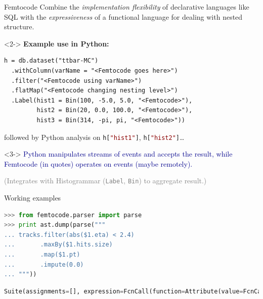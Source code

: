 \documentclass{beamer}
\begin{document}
\begin{frame}[fragile]{Femtocode}
\vspace{0.4 cm}
Combine the {\it implementation flexibility} of declarative languages like SQL with the {\it expressiveness} of a functional language for dealing with nested structure.

\vspace{0.5 cm}
\begin{uncoverenv}<2->
{\bf Example use in Python:}

\small
\begin{verbatim}
h = db.dataset("ttbar-MC")
  .withColumn(varName = "<Femtocode goes here>")
  .filter("<Femtocode using varName>")
  .flatMap("<Femtocode changing nesting level>")
  .Label(hist1 = Bin(100, -5.0, 5.0, "<Femtocode>"),
         hist2 = Bin(20, 0.0, 100.0, "<Femtocode>"),
         hist3 = Bin(314, -pi, pi, "<Femtocode>"))
\end{verbatim}

\normalsize
followed by Python analysis on {\small\tt h[\textcolor{darkred}{"hist1"}]}, {\small\tt h[\textcolor{darkred}{"hist2"}]}\ldots
\end{uncoverenv}

\vspace{0.1 cm}
\begin{uncoverenv}<3->
\textcolor{darkblue}{Python manipulates streams of events and accepts the result, while Femtocode (in quotes) operates on events (maybe remotely).}

\vspace{0.1 cm}
\textcolor{gray}{(Integrates with Histogrammar ({\tt\small Label}, {\tt\small Bin}) to aggregate result.)}
\end{uncoverenv}
\end{frame}

\begin{frame}[fragile]{Working examples}
\vspace{0.3 cm}
\begin{lstlisting}[language=python]
>>> from femtocode.parser import parse
>>> print ast.dump(parse("""
... tracks.filter(abs($1.eta) < 2.4)
...       .maxBy($1.hits.size)
...       .map($1.pt)
...       .impute(0.0)
... """))
\end{lstlisting}
\begin{lstlisting}[language=python,basicstyle=\ttfamily\scriptsize]
Suite(assignments=[], expression=FcnCall(function=Attribute(value=FcnCall(function=Attribute(value=FcnCall(function=Attribute(value=FcnCall(function=Attribute(value=Name(id='tracks', ctx=Load()), attr='filter', ctx=Load()), positional=[Compare(left=FcnCall(function=Name(id='abs', ctx=Load()), positional=[Attribute(value=AtArg(num=1), attr='eta', ctx=Load())], names=[], named=[]), ops=[Lt()], comparators=[Num(n=2.4)])], names=[], named=[]), attr='maxBy', ctx=Load()), positional=[Attribute(value=Attribute(value=AtArg(num=1), attr='hits', ctx=Load()), attr='size', ctx=Load())], names=[], named=[]), attr='map', ctx=Load()), positional=[Attribute(value=AtArg(num=1), attr='pt', ctx=Load())], names=[], named=[]), attr='impute', ctx=Load()), positional=[Num(n=0.0)], names=[], named=[]))
\end{lstlisting}
\end{frame}
\end{document}
